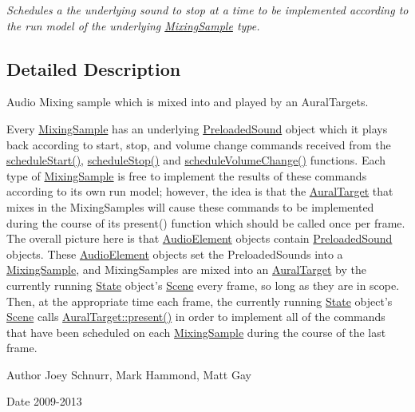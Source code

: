 \begin{DoxyCompactItemize}
\begin{DoxyCompactList}\small\item\em Schedules a the underlying sound to stop at a time to be implemented according to the run model of the underlying \hyperlink{class_picto_1_1_mixing_sample}{Mixing\-Sample} type. \end{DoxyCompactList}\end{DoxyCompactItemize}


\subsection{Detailed Description}
Audio Mixing sample which is mixed into and played by an Aural\-Targets. 

Every \hyperlink{class_picto_1_1_mixing_sample}{Mixing\-Sample} has an underlying \hyperlink{class_picto_1_1_preloaded_sound}{Preloaded\-Sound} object which it plays back according to start, stop, and volume change commands received from the \hyperlink{class_picto_1_1_mixing_sample_afe28101bad0e371ad2664220a2f13f61}{schedule\-Start()}, \hyperlink{class_picto_1_1_mixing_sample_a0de99d405334f14682c87b812726a034}{schedule\-Stop()} and \hyperlink{class_picto_1_1_mixing_sample_a2bdbed952aef586fd2d3a802aab0e004}{schedule\-Volume\-Change()} functions. Each type of \hyperlink{class_picto_1_1_mixing_sample}{Mixing\-Sample} is free to implement the results of these commands according to its own run model; however, the idea is that the \hyperlink{class_picto_1_1_aural_target}{Aural\-Target} that mixes in the Mixing\-Samples will cause these commands to be implemented during the course of its present() function which should be called once per frame. The overall picture here is that \hyperlink{class_picto_1_1_audio_element}{Audio\-Element} objects contain \hyperlink{class_picto_1_1_preloaded_sound}{Preloaded\-Sound} objects. These \hyperlink{class_picto_1_1_audio_element}{Audio\-Element} objects set the Preloaded\-Sounds into a \hyperlink{class_picto_1_1_mixing_sample}{Mixing\-Sample}, and Mixing\-Samples are mixed into an \hyperlink{class_picto_1_1_aural_target}{Aural\-Target} by the currently running \hyperlink{class_picto_1_1_state}{State} object's \hyperlink{class_picto_1_1_scene}{Scene} every frame, so long as they are in scope. Then, at the appropriate time each frame, the currently running \hyperlink{class_picto_1_1_state}{State} object's \hyperlink{class_picto_1_1_scene}{Scene} calls \hyperlink{class_picto_1_1_aural_target_a75d7885362d309900041bb7b02c3cfa1}{Aural\-Target\-::present()} in order to implement all of the commands that have been scheduled on each \hyperlink{class_picto_1_1_mixing_sample}{Mixing\-Sample} during the course of the last frame. \begin{DoxyAuthor}{Author}
Joey Schnurr, Mark Hammond, Matt Gay 
\end{DoxyAuthor}
\begin{DoxyDate}{Date}
2009-\/2013 
\end{DoxyDate}


